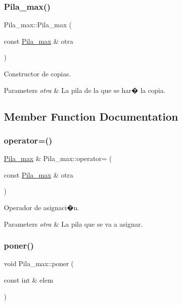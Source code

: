 \subsubsection{\texorpdfstring{Pila\+\_\+max()}{Pila\_max()}}
{\footnotesize\ttfamily Pila\+\_\+max\+::\+Pila\+\_\+max (\begin{DoxyParamCaption}\item[{const \mbox{\hyperlink{classPila__max}{Pila\+\_\+max}} \&}]{otra }\end{DoxyParamCaption})}



Constructor de copias. 


\begin{DoxyParams}{Parameters}
{\em otra} & La pila de la que se har� la copia. \\
\hline
\end{DoxyParams}


\subsection{Member Function Documentation}
\mbox{\label{classPila__max_a237f46b25334bf66e0bce3e0196c8c09}} 
\subsubsection{\texorpdfstring{operator=()}{operator=()}}
{\footnotesize\ttfamily \mbox{\hyperlink{classPila__max}{Pila\+\_\+max}} \& Pila\+\_\+max\+::operator= (\begin{DoxyParamCaption}\item[{const \mbox{\hyperlink{classPila__max}{Pila\+\_\+max}} \&}]{otra }\end{DoxyParamCaption})}



Operador de asignaci�n. 


\begin{DoxyParams}{Parameters}
{\em otra} & La pila que se va a asignar. \\
\hline
\end{DoxyParams}
\mbox{\label{classPila__max_afcf17a6fae06bbf0bf0b9ddae72305af}} 
\subsubsection{\texorpdfstring{poner()}{poner()}}
{\footnotesize\ttfamily void Pila\+\_\+max\+::poner (\begin{DoxyParamCaption}\item[{const int \&}]{elem }\end{DoxyParamCaption})}



